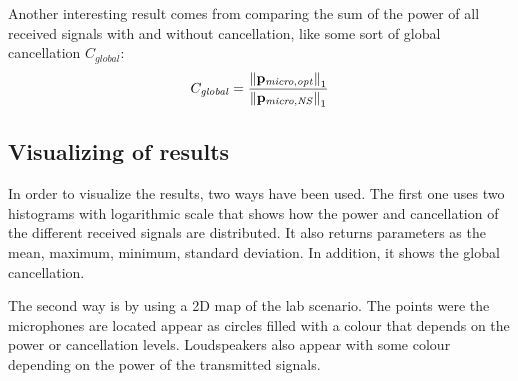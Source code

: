 Another interesting result comes from comparing the sum of the power of all received signals with and without cancellation, like some sort of global cancellation $C_\mathit{global}$:
\begin{equation}
C_\mathit{global} = \frac{\left\| \mathbf{p_\mathit{micro,opt}} \right\|_1}{\left\| \mathbf{p_\mathit{micro,NS}} \right\|_1}
\label{globalCancEq}
\end{equation}

\subsection{Visualizing of results}
In order to visualize the results, two ways have been used. The first one uses two histograms with logarithmic scale that shows how the power and cancellation of the different received signals are distributed. It also returns parameters as the mean, maximum, minimum, standard deviation. In addition, it shows the global cancellation.

The second way is by using a 2D map of the lab scenario. The points were the microphones are located appear as circles filled with a colour that depends on the power or cancellation levels. Loudspeakers also appear with some colour depending on the power of the transmitted signals.





